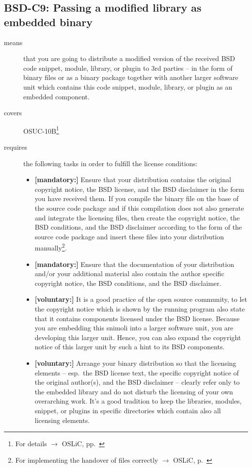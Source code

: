 \subsection{BSD-C9: Passing a modified library as embedded binary}
\label{OSUC-10B-BSD}

\begin{description}
\item[means] that you are going to distribute a modified version of the received
BSD code snippet, module, library, or plugin to 3rd parties -- in the form of
binary files or as a binary package together with another larger software unit
which contains this code snippet, module, library, or plugin as an embedded
component.
\item[covers] OSUC-10B\footnote{For details $\rightarrow$ OSLiC, pp.\
\pageref{OSUC-10B-DEF}}
\item[requires] the following tasks in order to fulfill the license conditions:
\begin{itemize}
  \item  \textbf{[mandatory:]} Ensure that your distribution contains the
  original copyright notice, the BSD license, and the BSD disclaimer in the form
  you have received them. If you compile the binary file on the base of the
  source code package and if this compilation does not also generate and
  integrate the licensing files, then create the copyright notice, the BSD
  conditions, and the BSD disclaimer according to the form of the source code
  package and insert these files into your distribution manually\footnote{For
  implementing the handover of files correctly $\rightarrow$ OSLiC, p.\
  \pageref{DistributingFilesHint}}.
  \item  \textbf{[mandatory:]} Ensure that the documentation of your
  distribution and/or your additional material also contain the author specific
  copyright notice, the BSD conditions, and the BSD disclaimer.
 \item \textbf{[voluntary:]} It is a good practice of the open source
  community, to let the copyright notice which is shown by the running program
  also state that it contains components licensed under the BSD license. Because
  you are embedding this snimoli into a larger software unit, you are
  developing this larger unit. Hence, you can also expand the copyright notice
  of this larger unit by such a hint to its BSD components.
  
  \item \textbf{[voluntary:]} Arrange your binary distribution so that the
  licensing elements -- esp.\ the BSD license text, the specific copyright
  notice of the original author(s), and the BSD disclaimer -- clearly refer
  only to the embedded library and do not disturb the licensing of your own
  overarching work. It's a good tradition to keep the libraries, modules,
  snippet, or plugins in specific directories which contain also all licensing
  elements.
\end{itemize}


\end{description}
